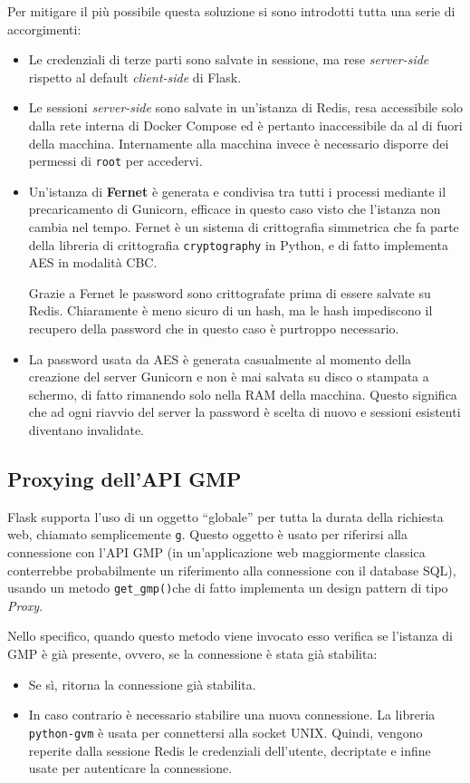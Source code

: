 Per mitigare il più possibile questa soluzione si sono introdotti tutta una serie di accorgimenti:
\begin{itemize}
    \item Le credenziali di terze parti sono salvate in sessione, ma rese \emph{server-side} rispetto al default \emph{client-side} di Flask.
    \item Le sessioni \emph{server-side} sono salvate in un'istanza di Redis, resa accessibile solo dalla rete interna di Docker Compose ed è pertanto inaccessibile da al di fuori della macchina. Internamente alla macchina invece è necessario disporre dei permessi di \texttt{root} per accedervi.
    \item Un'istanza di \textbf{Fernet} è generata e condivisa tra tutti i processi mediante il precaricamento di Gunicorn, efficace in questo caso visto che l'istanza non cambia nel tempo. Fernet è un sistema di crittografia simmetrica che fa parte della libreria di crittografia \texttt{cryptography} in Python, e di fatto implementa AES in modalità CBC.
    
    Grazie a Fernet le password sono crittografate prima di essere salvate su Redis. Chiaramente è meno sicuro di un hash, ma le hash impediscono il recupero della password che in questo caso è purtroppo necessario.
    \item La password usata da AES è generata casualmente al momento della creazione del server Gunicorn e non è mai salvata su disco o stampata a schermo, di fatto rimanendo solo nella RAM della macchina. Questo significa che ad ogni riavvio del server la password è scelta di nuovo e sessioni esistenti diventano invalidate.
\end{itemize}

\subsection{Proxying dell'API GMP}
Flask supporta l'uso di un oggetto ``globale'' per tutta la durata della richiesta web, chiamato semplicemente \texttt{g}. Questo oggetto è usato per riferirsi alla connessione con l'API GMP (in un'applicazione web maggiormente classica conterrebbe probabilmente un riferimento alla connessione con il database SQL), usando un metodo \texttt{get\_gmp()}che di fatto implementa un design pattern di tipo \emph{Proxy}.

Nello specifico, quando questo metodo viene invocato esso verifica se l'istanza di GMP è già presente, ovvero, se la connessione è stata già stabilita:
\begin{itemize}
    \item Se sì, ritorna la connessione già stabilita.
    \item In caso contrario è necessario stabilire una nuova connessione. La libreria \texttt{python-gvm} è usata per connettersi alla socket UNIX. Quindi, vengono reperite dalla sessione Redis le credenziali dell'utente, decriptate e infine usate per autenticare la connessione.
\end{itemize}

